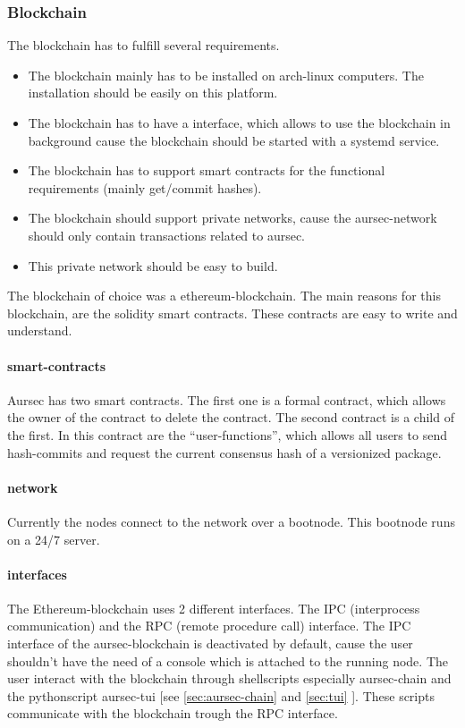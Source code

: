 \subsubsection{Blockchain} \label{sec:blockchain}
The blockchain has to fulfill several requirements. %
\begin{itemize}
	\item The blockchain mainly has to be installed on arch-linux computers. The installation should be easily on this platform.
	\item The blockchain has to have a interface, which allows to use the blockchain in background cause the blockchain should be started with a systemd service.
	\item The blockchain has to support smart contracts for the functional requirements (mainly get/commit hashes).
	\item The blockchain should support private networks, cause the aursec-network should only contain transactions related to aursec.
	\item This private network should be easy to build.
\end{itemize}

The blockchain of choice was a ethereum-blockchain. The main reasons for this blockchain, are the solidity smart contracts. These contracts are easy to write and understand. 

\paragraph*{smart-contracts}
Aursec has two smart contracts. The first one is a formal contract, which allows the owner of the contract to delete the contract. The second contract is a child of the first. In this contract are the ``user-functions'', which allows all users to send hash-commits and request the current consensus hash of a versionized package. 

\paragraph*{network}
Currently the nodes connect to the network over a bootnode. This bootnode runs on a 24/7 server.

\paragraph*{interfaces}
The Ethereum-blockchain uses 2 different interfaces. The IPC (interprocess communication) and the RPC (remote procedure call) interface. The IPC interface of the aursec-blockchain is deactivated by default, cause the user shouldn't have the need of a console which is attached to the running node. The user interact with the blockchain through shellscripts especially aursec-chain and the pythonscript aursec-tui [see \ref{sec:aursec-chain} and \ref{sec:tui} ]. These scripts communicate with the blockchain trough the RPC interface. 